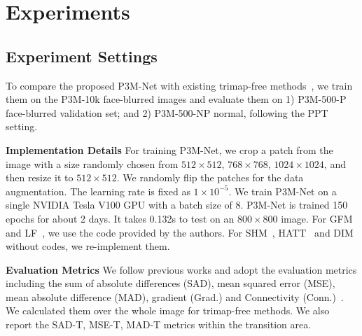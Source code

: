 \documentclass[sigconf]{acmart}
\begin{document}
\section{Experiments}
\subsection{Experiment Settings}
To compare the proposed P3M-Net with existing trimap-free methods~\cite{shm,lf,hatt,gfm}, we train them on the P3M-10k face-blurred images and evaluate them on 1) P3M-500-P face-blurred validation set; and 2) P3M-500-NP normal, following the PPT setting.

\noindent\textbf{Implementation Details}
For training P3M-Net, we crop a patch from the image with a size randomly chosen from $512\times512$, $768\times768$, $1024\times1024$, and then resize it to $512\times512$. We randomly flip the patches for the data augmentation. The learning rate is fixed as $1\times10^{-5}$. We train P3M-Net on a single NVIDIA Tesla V100 GPU with a batch size of 8. P3M-Net is trained 150 epochs for about 2 days. It takes 0.132s to test on an $800\times800$ image. For GFM~\cite{gfm} and LF~\cite{lf}, we use the code provided by the authors. For SHM~\cite{shm}, HATT~\cite{hatt} and DIM~\cite{dim} without codes, we re-implement them.

\noindent\textbf{Evaluation Metrics} We follow previous works and adopt the evaluation metrics including the sum of absolute differences (SAD), mean squared error (MSE), mean absolute difference (MAD), gradient (Grad.) and Connectivity (Conn.)~\cite{rhemann2009perceptually}. We calculated them over the whole image for trimap-free methods. We also report the SAD-T, MSE-T, MAD-T metrics within the transition area.
\end{document}
